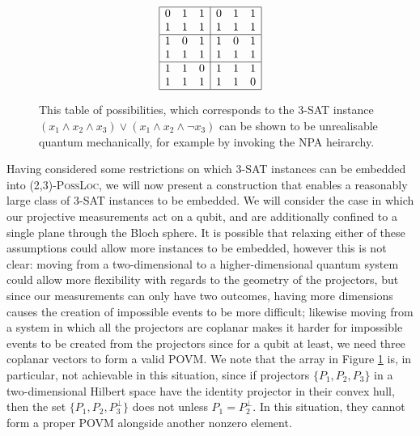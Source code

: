 \documentclass[reprint]{revtex4-1}
\theoremstyle{definition}
\begin{document}
\begin{figure}
\begin{equation*} 
\begin{array}{  | c c  c| c c c|}
\hline
 0 & 1 & 1 & 0 & 1 & 1 \\
 1 & 1& 1& 1 & 1& 1 \\ \hline
 1 &0 & 1 & 1 &0 & 1 \\
 1 & 1& 1 & 1 & 1& 1  \\ \hline
 1 & 1 & 0&  1 & 1 & 1\\
 1 & 1& 1 &1 & 1 & 0 \\ \hline
 \end{array}
 \end{equation*} 
\caption{This table of possibilities, which corresponds to the \textsc{3-SAT} instance $(x_1\wedge x_2 \wedge x_3)\vee (x_1\wedge x_2 \wedge \neg x_3)$ can be shown to be unrealisable quantum mechanically, for example by invoking the NPA heirarchy.}
\label{badarray}
\end{figure}
 
Having considered some restrictions on which \textsc{3-SAT} instances can be embedded into \textsc{(2,3)-PossLoc}, we will now present a construction that enables a reasonably large class of \textsc{3-SAT} instances to be embedded. We will consider the case in which our projective measurements act on a qubit, and are additionally confined to a single plane through the Bloch sphere. It is possible that relaxing either of these assumptions could allow more instances to be embedded, however this is not clear: moving from a two-dimensional to a higher-dimensional quantum system could allow more flexibility with regards to the geometry of the projectors, but since our measurements can only have two outcomes, having more dimensions causes the creation of impossible events to be more difficult; likewise moving from a system in which all the projectors are coplanar makes it harder for impossible events to be created from the projectors since for a qubit at least, we need three coplanar vectors to form a valid POVM. 
We note that the array in Figure \ref{badarray} is, in particular, not achievable in this situation, since if projectors $\{P_1,P_2,P_3\}$ in a two-dimensional Hilbert space have the identity projector in their convex hull, then the set $\{P_1,P_2, P_3^\perp\}$ does not unless $P_1=P_2^\perp$. In this situation, they cannot form a proper POVM alongside another nonzero element.
\end{document}
